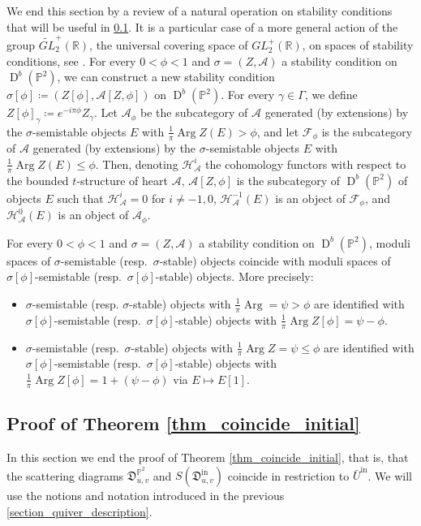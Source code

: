 \documentclass[12pt, a4paper]{amsart}
\newcommand\PP{\mathbb P}
\newcommand\R{\mathbb R}
\newcommand\cA{\mathcal A}
\newcommand\cF{\mathcal F}
\newcommand\cH{\mathcal H}
\newcommand\fD{\mathfrak D}
\newcommand\Arg{\operatorname{Arg}}
\newcommand\D{\operatorname{D}}
\newcommand\iin{\mathrm{in}}
\begin{document}
We end this section by a review of a natural operation on stability conditions that will be useful in
\cref{section_proof_initial}.
It is a particular case of a more general action of the group  $\widetilde{GL}^+_2(\R)$, the universal covering space of 
$GL^+_2(\R)$, on spaces of stability conditions, see 
\cite[Lemma 8.2]{MR2373143}.
For every $0 <\phi<1$ and $\sigma=(Z,\cA)$ a stability condition on $\D^b(\PP^2)$, we can construct a new stability condition
$\sigma[\phi]\coloneq (Z[\phi],\cA[Z,\phi])$
on $\D^b(\PP^2)$. For every $\gamma \in \Gamma$, we define
$Z[\phi]_\gamma \coloneq e^{-i\pi \phi} Z_\gamma$.
Let $\cA_\phi$
be the subcategory of 
$\cA$ generated (by extensions)
by the $\sigma$-semistable objects $E$ with  $\frac{1}{\pi}\Arg Z(E)
>\phi$, 
and let 
$\cF_\phi$ is the subcategory of $\cA$
generated (by extensions) by the 
$\sigma$-semistable objects $E$ with $\frac{1}{\pi}
\Arg Z(E) \leqslant \phi$.
Then, denoting $\cH^i_\cA$ the cohomology functors with respect to the bounded 
$t$-structure of heart $\cA$,
$\cA[Z,\phi]$ 
is the subcategory of $\D^b(\PP^2)$ of objects $E$ such that 
$\cH^i_\cA=0$ for $i \neq -1,0$, 
$\cH^{-1}_\cA(E)$ is an object of 
$\cF_\phi$, and $\cH^0_\cA(E)$ is an object of $\cA_\phi$.


For every $0<\phi<1$ and $\sigma=(Z,\cA)$
a stability condition on $\D^b(\PP^2)$, 
moduli spaces of $\sigma$-semistable (resp.\
$\sigma$-stable) objects coincide with moduli spaces of $\sigma[\phi]$-semistable
(resp.\ $\sigma[\phi]$-stable) objects.
More precisely:
\begin{itemize}
\item[(i)] $\sigma$-semistable (resp. $\sigma$-stable) objects with
$\frac{1}{\pi} \Arg=\psi > \phi$ are identified with $\sigma[\phi]$-semistable
(resp.\ $\sigma[\phi]$-stable) objects with $\frac{1}{\pi} \Arg Z[\phi] = \psi - \phi$.
\item[(ii)] $\sigma$-semistable (resp.\ 
$\sigma$-stable) objects with 
$\frac{1}{\pi}\Arg Z = \psi \leqslant \phi$ are identified with $\sigma[\phi]$-semistable  (resp.\ $\sigma[\phi]$-stable) objects with
$\frac{1}{\pi} \Arg Z[\phi] = 1 + (\psi- \phi)$ via $E \mapsto E[1]$.
\end{itemize}


\subsection{Proof of Theorem \ref{thm_coincide_initial}}
\label{section_proof_initial}

In this section we end the proof of Theorem 
\ref{thm_coincide_initial}, that is, that the scattering diagrams $\fD^{\PP^2}_{u,v}$ and 
$S(\fD_{u,v}^\iin)$ coincide in restriction to $\bar{U}^\iin$. 
We will use the notions and notation introduced in the previous \cref{section_quiver_description}.
\end{document}
